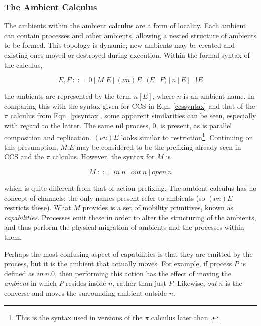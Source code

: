 \subsubsection{The Ambient Calculus}
\label{ambientcalculus}

The ambients within the ambient calculus \cite{amb} are a form of
locality.  Each ambient can contain processes and other ambients,
allowing a nested structure of ambients to be formed.  This topology
is dynamic; new ambients may be created and existing ones moved or
destroyed during execution.  Within the formal syntax of the calculus,

\begin{equation}
\label{ambsyntax}
  E, F\ ::=\ 
  0\ |\ 
  M.E\ |\ 
  (\nu n)E\ |\ 
  (E\ |\ F)\ |\ 
  n[E]\ |\ 
  !E
\end{equation}

\noindent the ambients are represented by the term $n[E]$, where $n$
is an ambient name.  In comparing this with the syntax given for CCS
in Eqn. \ref{ccssyntax} and that of the $\pi$ calculus from Eqn.
\ref{pisyntax}, some apparent similarities can be seen, especially
with regard to the latter.  The same nil process, $0$, is present, as
is parallel composition and replication.  $(\nu n)E$ looks similar to
restriction\footnote{This is the syntax used in versions of the $\pi$
  calculus later than \cite{funcproc}.}.  Continuing on this
presumption, $M.E$ may be considered to be the prefixing already seen
in CCS and the $\pi$ calculus.  However, the syntax for $M$ is

\begin{equation}
\label{ambsyntaxcap}
  M\ ::=\ 
  in\ n\ |\
  out\ n\ | \
  open\ n
\end{equation}

\noindent which is quite different from that of action prefixing.  The
ambient calculus has no concept of channels; the only names present
refer to ambients (so $(\nu n)E$ restricts these).  What $M$ provides
is a set of mobility primitives, known as \emph{capabilities}.
Processes emit these in order to alter the structuring of the
ambients, and thus perform the physical migration of ambients and the
processes within them.

Perhaps the most confusing aspect of capabilities is that they are
emitted by the process, but it is the ambient that actually moves.
For example, if process $P$ is defined as $in\ n.0$, then performing
this action has the effect of moving the \emph{ambient} in which $P$
resides inside $n$, rather than just $P$.  Likewise, $out\ n$ is the
converse and moves the surrounding ambient outside $n$.

